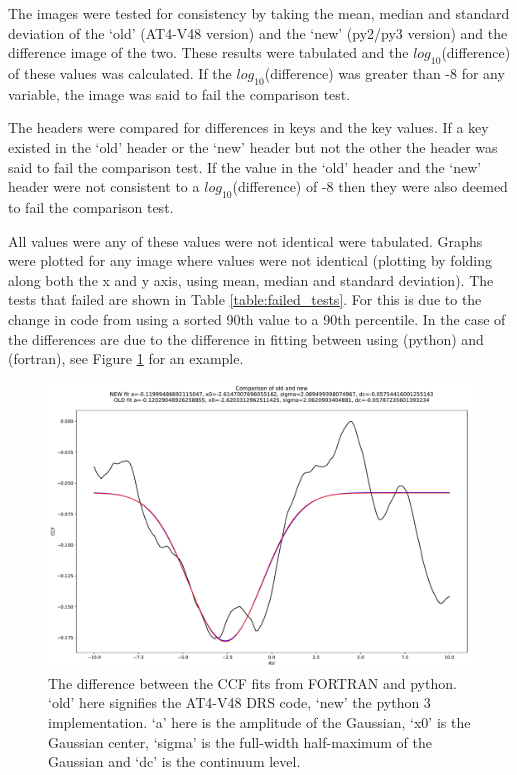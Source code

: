 The images were tested for consistency by taking the mean, median and standard deviation of the `old' (AT4-V48 version) and the `new' (py2/py3 version) and the difference image of the two. These results were tabulated and the $log_{10}$(difference) of these values was calculated. If the $log_{10}$(difference) was greater than -8 for any variable, the image was said to fail the comparison test.

The headers were compared for differences in keys and the key values. If a key existed in the `old' header or the `new' header but not the other the header was said to fail the comparison test. If the value in the `old' header and the `new' header were not consistent to a $log_{10}$(difference) of -8 then they were also deemed to fail the comparison test.

All values were any of these values were not identical were tabulated. Graphs were plotted for any image where values were not identical (plotting by folding along both the x and y axis, using mean, median and standard deviation). The tests that failed are shown in Table \ref{table:failed_tests}.
For \calbadpix this is due to the change in code from using a sorted 90th value to a 90th percentile. In the case of \calCCF the differences are due to the difference in fitting between using  (python) and  (fortran), see Figure \ref{figure:ccf_fitting_probelm} for an example.


\begin{figure}
\begin{center}
\includegraphics[width=.8\textwidth]{Figures/CCF_fitting_difference.pdf}
\end{center}
\caption{ The difference between the CCF fits from FORTRAN and python. `old' here signifies the AT4-V48 DRS code, `new' the python 3 implementation. `a' here is the amplitude of the Gaussian, `x0' is the Gaussian center, `sigma' is the full-width half-maximum of the Gaussian and `dc' is the continuum level. \label{figure:ccf_fitting_probelm}}
\end{figure}


